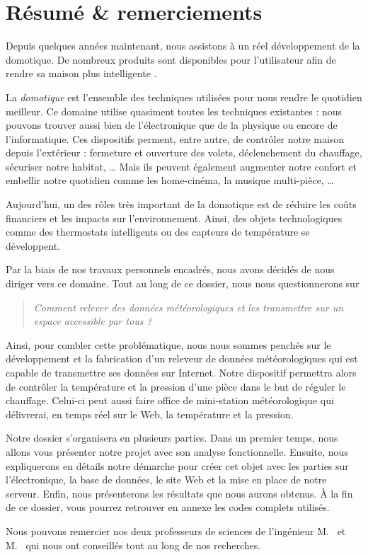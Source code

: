 \chapter*{Résumé \&{} remerciements}

Depuis quelques années maintenant, nous assistons à un réel développement de la domotique. De nombreux produits sont disponibles pour l'utilisateur afin de rendre sa maison plus \og intelligente \fg.

La \emph{domotique} est l'ensemble des techniques utilisées pour nous rendre le quotidien meilleur. Ce domaine utilise quasiment toutes les techniques existantes : nous pouvons trouver aussi bien de l'électronique que de la physique ou encore de l'informatique. Ces dispositifs perment, entre autre, de contrôler notre maison depuis l'extérieur : fermeture et ouverture des volets, déclenchement du chauffage, sécuriser notre habitat, \dots{} Mais ils peuvent également augmenter notre confort et embellir notre quotidien comme les home-cinéma, la musique multi-pièce, \dots

Aujourd'hui, un des rôles très important de la domotique est de réduire les coûts financiers et les impacts sur l'environnement. Ainsi, des objets technologiques comme des thermostats intelligents ou des capteurs de température se développent.

\Espace

Par la biais de nos travaux personnels encadrés, nous avons décidés de nous diriger vers ce domaine. Tout au long de ce dossier, nous nous questionnerons sur
\begin{quotation}
	\noindent\itshape Comment relever des données météorologiques et les transmettre sur un espace accessible par tous ?
\end{quotation}
Ainsi, pour combler cette problématique, nous nous sommes penchés sur le développement et la fabrication d'un releveur de données météorologiques qui est capable de transmettre ses données sur Internet. Notre dispositif permettra alors de contrôler la température et la pression d'une pièce dans le but de réguler le chauffage. Celui-ci peut aussi faire office de mini-station météorologique qui délivrerai, en temps réel sur le Web, la température et la pression.

Notre dossier s'organisera en plusieurs parties. Dans un premier temps, nous allons vous présenter notre projet avec son analyse fonctionnelle. Ensuite, nous expliquerons en détails notre démarche pour créer cet objet avec les parties sur l'électronique, la base de données, le site Web et la mise en place de notre serveur. Enfin, nous présenterons les résultats que nous aurons obtenus. À la fin de ce dossier, vous pourrez retrouver en annexe les codes complets utilisés.

\Espace

Nous pouvons remercier nos deux professeurs de sciences de l'ingénieur M.~ et M.~ qui nous ont conseillés tout au long de nos recherches.